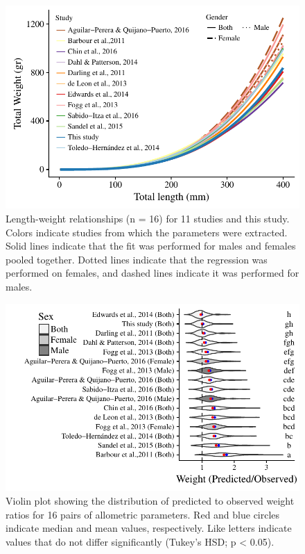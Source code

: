 \documentclass[fleqn,10pt,lineno]{wlpeerj} %
\begin{document}
\begin{figure}
\centering
\includegraphics{Manuscript_files/figure-latex/unnamed-chunk-6-1.pdf}
\caption{\label{fig:all_allo}Length-weight relationships (n = 16) for 11
studies and this study. Colors indicate studies from which the
parameters were extracted. Solid lines indicate that the fit was
performed for males and females pooled together. Dotted lines indicate
that the regression was performed on females, and dashed lines indicate
it was performed for males.}
\end{figure}

\begin{figure}
\centering
\includegraphics{Manuscript_files/figure-latex/unnamed-chunk-7-1.pdf}
\caption{\label{fig:bio_ratio}Violin plot showing the distribution of
predicted to observed weight ratios for 16 pairs of allometric
parameters. Red and blue circles indicate median and mean values,
respectively. Like letters indicate values that do not differ
significantly (Tukey's HSD; p \textless{} 0.05).}
\end{figure}
\end{document}
